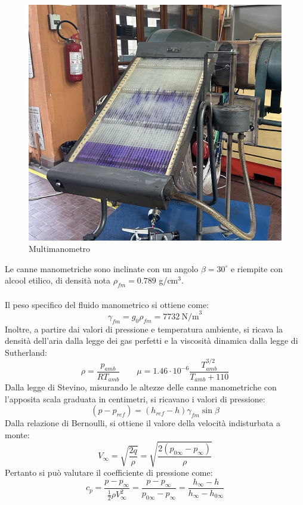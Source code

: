 \begin{figure}[H]
    \centering
    \includegraphics[width=.8\textwidth]{images/5/multimanometro.jpg}
    \caption{Multimanometro}
\end{figure}

\noindent Le canne manometriche sono inclinate con un angolo $\beta=30^\circ$ e riempite con alcool etilico, di densità nota $\rho_{fm} = 0.789$ g/cm$^3$.\\\\
Il peso specifico del fluido manometrico si ottiene come:
\begin{equation*}
    \gamma_{fm} = g_0 \rho_{fm} = 7732\ \text{N/m}^3
\end{equation*}
Inoltre, a partire dai valori di pressione e temperatura ambiente, si ricava la densità dell'aria dalla legge dei gas perfetti e la viscosità dinamica dalla legge di Sutherland:
\begin{equation*}
    \rho = \frac{p_{amb}}{RT_{amb}} \qquad \mu = 1.46\cdot10^{-6} \frac{T_{amb}^{3/2}}{T_{amb}+110}
\end{equation*}
Dalla legge di Stevino, misurando le altezze delle canne manometriche con l'apposita scala graduata in centimetri, si ricavano i valori di pressione:
\begin{equation*}
    (p-p_{ref}) = (h_{ref}-h) \gamma_{fm} \sin \beta
\end{equation*}
Dalla relazione di Bernoulli, si ottiene il valore della velocità indisturbata a monte:
\begin{equation*}
    V_\infty = \sqrt{\frac{2q}\rho} = \sqrt{\frac{2(p_{0\infty}-p_\infty)}{\rho}}
\end{equation*}
Pertanto si può valutare il coefficiente di pressione come:
\begin{equation*}
    c_p = \frac{p-p_{\infty}}{\frac12 \rho V_\infty^2} = \frac{p-p_\infty}{p_{0\infty}-p_\infty} = \frac{h_\infty-h}{h_\infty-h_{0\infty}}
\end{equation*}

